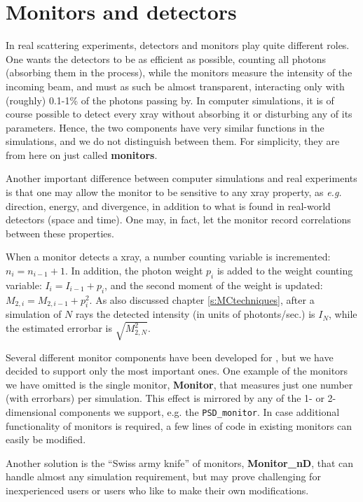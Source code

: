 \chapter{Monitors and detectors}

In real scattering experiments, detectors and monitors play quite
different roles. One wants the detectors to be as efficient as
possible, counting all photons (absorbing them in the process),
while the monitors measure the intensity of the incoming beam, and must
as such be almost transparent, interacting only with (roughly) 0.1-1\%
of the photons passing by. In computer simulations, it is
of course possible to detect every xray without
absorbing it or disturbing any of its parameters. Hence, the two components
have very similar functions in the simulations, and we do
not distinguish between them. For simplicity, they are from here on
just called \textbf{monitors}.

Another important difference between computer simulations
and real experiments is
that one may allow the monitor to be sensitive to any xray property,
as {\em e.g.} direction, energy, and divergence, in addition to what
is found in real-world detectors (space and time). One may, in
fact, let the monitor    record correlations between these properties.

When a monitor detects a xray,
a number counting variable is incremented: $n_i = n_{i-1}+1$.
In addition, the photon
weight $p_i$ is added to the weight counting variable:
$I_i = I_{i-1} + p_i$,
and the second moment of the weight is
updated: $M_{2,i} = M_{2,i-1} + p_i^2$.
As also discussed chapter \ref{s:MCtechniques}, after a simulation of $N$ rays
the detected intensity (in units of photonts/sec.) is $I_N$,
while the estimated errorbar is $\sqrt{M_{2,N}^2}$.

Several different monitor components have been developed for
\MCX , but we have decided to support only the most important ones.
One example of the monitors we have omitted is the single monitor,
\textbf{Monitor},
that measures just one number (with errorbars) per simulation.
This effect is mirrored by any of the 1- or 2-dimensional components
we support, e.g. the \texttt{PSD\_monitor}.
In case additional functionality of monitors is required,
a few lines of code in existing monitors can easily be modified.

Another solution is the ``Swiss army knife'' of monitors, \textbf{Monitor\_nD}, that can handle
almost any simulation requirement, but may prove challenging for inexperienced users or users who like to make their own modifications.

\newpage















\newpage



